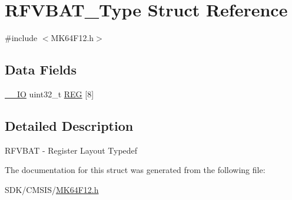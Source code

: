 \hypertarget{struct_r_f_v_b_a_t___type}{}\section{R\+F\+V\+B\+A\+T\+\_\+\+Type Struct Reference}
\label{struct_r_f_v_b_a_t___type}


{\ttfamily \#include $<$M\+K64\+F12.\+h$>$}

\subsection*{Data Fields}
\begin{DoxyCompactItemize}
\item 
\mbox{\hyperlink{core__cm4_8h_aec43007d9998a0a0e01faede4133d6be}{\+\_\+\+\_\+\+IO}} uint32\+\_\+t \mbox{\hyperlink{group___v_r_e_f___peripheral___access___layer_gad1d411f494430b8bfb7e89e78efd49be}{R\+EG}} \mbox{[}8\mbox{]}
\end{DoxyCompactItemize}


\subsection{Detailed Description}
R\+F\+V\+B\+AT -\/ Register Layout Typedef 

The documentation for this struct was generated from the following file\+:\begin{DoxyCompactItemize}
\item 
S\+D\+K/\+C\+M\+S\+I\+S/\mbox{\hyperlink{_m_k64_f12_8h}{M\+K64\+F12.\+h}}\end{DoxyCompactItemize}

